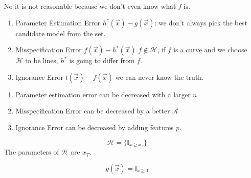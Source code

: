 \documentclass[12pt]{article}
\begin{document}
\begin{enumerate}
No it is not reasonable because we don't even know what $f$ is. 


\begin{enumerate}
\item Parameter Estimation Error $h^*(\vec{x})-g(\vec{x})$: we don't always pick the best candidate model from the set.
\item Misspecification Error $f(\vec{x})-h^*(\vec{x})$ $f \notin \mathcal{H}$, if $f$ is a curve and we choose $\mathcal{H}$ to be lines, $h^*$ is going to differ from $f$.
\item Ignorance Error $t(\vec{x})-f(\vec{x})$ we can never know the truth.
\end{enumerate}


\begin{enumerate}
\item Parameter estimation error can be decreased with a larger $n$
\item Misspecification Error can be decreased by a better $\mathcal{A}$
\item Ignorance Error can be decreased by adding features $p$.
\end{enumerate}


\begin{equation*}
\mathcal{H}=\{\mathbb{I}_{x\geq x_T}\}
\end{equation*}
The parameters of $\mathcal{H}$ are $x_T$.

\begin{equation*}
g(\vec{x})=\mathbb{I}_{x\geq1}
\end{equation*}
\end{enumerate}
\end{document}
